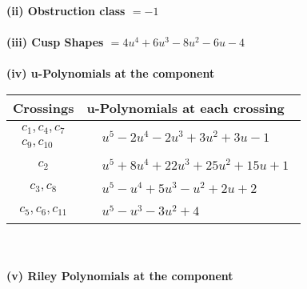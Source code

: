 \documentclass[1p]{elsarticle_modified}
\theoremstyle{definition}
\begin{document}
\flushleft \textbf{(ii) Obstruction class $= -1$}\\~\\
\flushleft \textbf{(iii) Cusp Shapes $= 4 u^4+6 u^3-8 u^2-6 u-4$}\\~\\
\newpage\renewcommand{\arraystretch}{1}
\flushleft \textbf{(iv) u-Polynomials at the component}\newline \\
\begin{tabular}{m{50pt}|m{274pt}}
Crossings & \hspace{64pt}u-Polynomials at each crossing \\
\hline $$\begin{aligned}c_{1},c_{4},c_{7}\\c_{9},c_{10}\end{aligned}$$&$\begin{aligned}
&u^5-2 u^4-2 u^3+3 u^2+3 u-1
\end{aligned}$\\
\hline $$\begin{aligned}c_{2}\end{aligned}$$&$\begin{aligned}
&u^5+8 u^4+22 u^3+25 u^2+15 u+1
\end{aligned}$\\
\hline $$\begin{aligned}c_{3},c_{8}\end{aligned}$$&$\begin{aligned}
&u^5- u^4+5 u^3- u^2+2 u+2
\end{aligned}$\\
\hline $$\begin{aligned}c_{5},c_{6},c_{11}\end{aligned}$$&$\begin{aligned}
&u^5- u^3-3 u^2+4
\end{aligned}$\\
\hline
\end{tabular}\\~\\
\newpage\renewcommand{\arraystretch}{1}
\flushleft \textbf{(v) Riley Polynomials at the component}\newline \\
\end{document}
